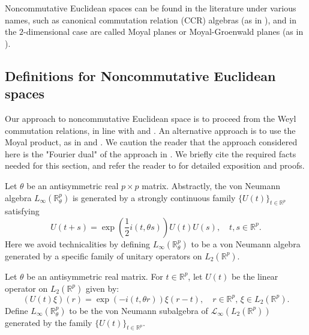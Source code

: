     Noncommutative Euclidean spaces can be found in the literature under various names, such as canonical commutation relation (CCR) algebras (as in \cite[Section 5.2.2.2]{Bratteli-Robinson2}),
    and in the $2$-dimensional case are called Moyal planes or Moyal-Groenwald planes (as in \cite{gayral-moyal}).
        
        
\subsection{Definitions for Noncommutative Euclidean spaces}\label{ncp definitions subsection}
    Our approach to noncommutative Euclidean space is to proceed from the Weyl commutation relations, in line with \cite[Section 5.2.2.2]{Bratteli-Robinson2} and \cite{LeSZ-cwikel}. An alternative
    approach is to use the Moyal product, as in \cite{gayral-moyal} and \cite[Section 5.2]{CGRS2}. We caution the reader that the approach considered here is the "Fourier dual" of the approach in \cite{gayral-moyal}.
    We briefly cite the required facts needed for this section, and refer the reader to \cite{LeSZ-cwikel} for detailed exposition and proofs.
    
    Let $\theta$ be an antisymmetric real $p\times p$ matrix. 
    Abstractly, the von Neumann algebra $L_\infty(\mathbb{R}^p_\theta)$ is generated by a strongly continuous family $\{U(t)\}_{t \in \mathbb{R}^p}$ satisfying
    \begin{equation}\label{weyl CCR}
        U(t+s) = \exp\left(\frac{1}{2}i(t,\theta s)\right)U(t)U(s),\quad t,s \in  \mathbb{R}^p.
    \end{equation}
    Here we avoid technicalities by defining $L_\infty(\mathbb{R}^p_\theta)$ to be a von Neumann algebra generated by a specific family of unitary operators on $L_2(\mathbb{R}^p)$.
    
    \begin{defi}
        Let $\theta$ be an antisymmetric real matrix. For $t \in \mathbb{R}^p$, let $U(t)$ be the linear operator on $L_2(\mathbb{R}^p)$ given by:
        \begin{equation*}
            (U(t)\xi)(r) = \exp\left(-i(t,\theta r)\right)\xi(r-t),\quad r \in \mathbb{R}^p,\,\xi \in L_2(\mathbb{R}^p).
        \end{equation*}
        Define $L_\infty(\mathbb{R}^p_\theta)$ to be the von Neumann subalgebra of $\mathcal{L}_\infty(L_2(\mathbb{R}^p))$ generated by the family $\{U(t)\}_{t \in \mathbb{R}^p}$.
    \end{defi}
    
